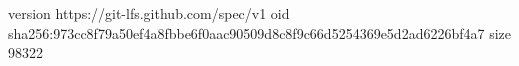 version https://git-lfs.github.com/spec/v1
oid sha256:973cc8f79a50ef4a8fbbe6f0aac90509d8c8f9c66d5254369e5d2ad6226bf4a7
size 98322

